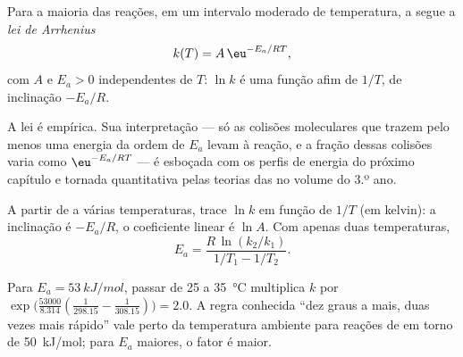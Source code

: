 \begin{theorem}\label{thm:b1:rate-laws:arrhenius}
Para a maioria das reações, em um intervalo moderado de temperatura, a
 segue a \emph{lei de Arrhenius}
\[
  k(T) = A\,\eu^{-E_a/RT} ,
\]
com $A$ e $E_a > 0$ independentes de $T$: $\ln k$ é uma função afim de
$1/T$, de inclinação $-E_a/R$.
\end{theorem}
\admitted

\begin{remark}[O significado de $E_a$]\label{rem:b1:rate-laws:meaning}
A lei é empírica. Sua interpretação --- só as colisões moleculares que
trazem pelo menos uma energia da ordem de $E_a$ levam à reação, e a
fração dessas colisões varia como $\eu^{-E_a/RT}$ --- é esboçada com os
perfis de energia do próximo capítulo e tornada quantitativa pelas
teorias das  no volume do 3.º ano.
\end{remark}

\begin{method}[Determinar $E_a$]\label{met:b1:rate-laws:arrhenius-plot}
A partir de  a várias temperaturas, trace $\ln k$
em função de $1/T$ (em kelvin): a inclinação é $-E_a/R$, o coeficiente
linear é $\ln A$. Com apenas duas temperaturas,
\[
  E_a = \frac{R\,\ln(k_2/k_1)}{1/T_1 - 1/T_2} .
\]
\end{method}

\begin{example}\label{ex:b1:rate-laws:doubling}
Para $E_a = \qty{53}{kJ/mol}$, passar de 25 a \qty{35}{\celsius}
multiplica $k$ por $\exp\!\big(\frac{53000}{8.314}(\frac{1}{298.15} -
\frac{1}{308.15})\big) = 2.0$. A regra conhecida ``dez graus a mais, duas
vezes mais rápido'' vale perto da temperatura ambiente para reações de
 em torno de \qty{50}{kJ/mol}; para $E_a$ maiores, o
fator é maior.
\end{example}

